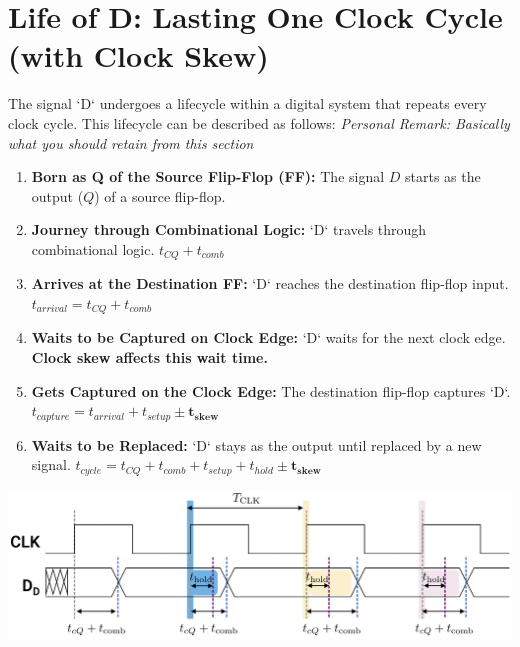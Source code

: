 \documentclass[12pt,openany]{book}
\begin{document}
\section{Life of D: Lasting One Clock Cycle (with Clock Skew)}
The signal `D` undergoes a lifecycle within a digital system that repeats every clock cycle. This lifecycle can be described as follows:
\textit{Personal Remark: Basically what you should retain from this section}
\newline
\vspace*{10px}
\hspace*{-25px}
\begin{minipage}{0.5\textwidth}

	\begin{justify}
		\begin{enumerate}
		    \item \textbf{Born as Q of the Source Flip-Flop (FF):} The signal $D$ starts as the output ($Q$) of a source flip-flop.
			\item \textbf{Journey through Combinational Logic:} `D` travels through combinational logic. $ t_{CQ} + t_{comb}$
		    \item \textbf{Arrives at the Destination FF:} `D` reaches the destination flip-flop input. $ t_{arrival} = t_{CQ} + t_{comb}$
		    \item \textbf{Waits to be Captured on Clock Edge:} `D` waits for the next clock edge. \textbf{Clock skew affects this wait time.}
			\item \textbf{Gets Captured on the Clock Edge:} The destination flip-flop captures `D`. $ t_{capture} = t_{arrival} + t_{setup} \pm \bm{t_{skew}}$
		    \item \textbf{Waits to be Replaced:} `D` stays as the output until replaced by a new signal. \newline $ t_{cycle} = t_{CQ} + t_{comb} + t_{setup} + t_{hold} \pm \bm{t_{skew}}$
		\end{enumerate}
	\end{justify}
\end{minipage}
\hfill
\vline
\hfill
\begin{minipage}{0.5\textwidth}
	\includegraphics[width=1.2\textwidth]{circuits/15.4.png}
\end{minipage}
\newline
\end{document}
